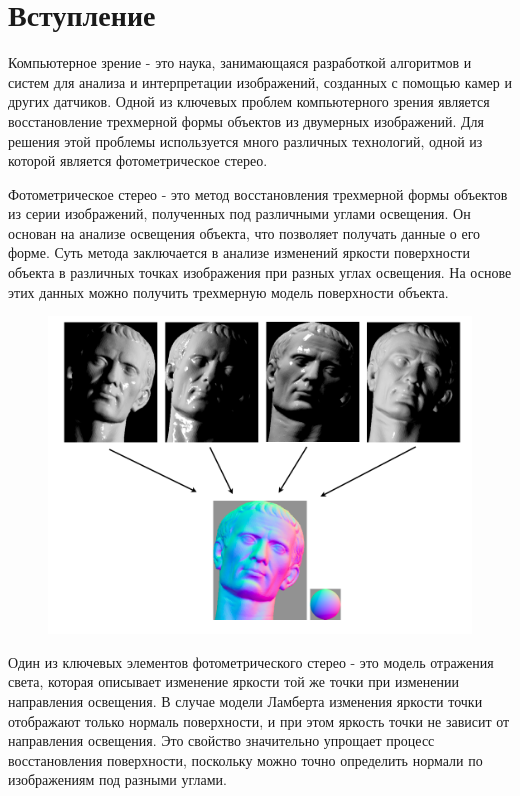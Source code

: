 \section{Вступление}

Компьютерное зрение - это наука, занимающаяся разработкой алгоритмов
и систем для анализа и интерпретации изображений, созданных с помощью
камер и других датчиков. Одной из ключевых проблем компьютерного
зрения является восстановление трехмерной формы объектов
из двумерных изображений. Для решения этой проблемы используется
много различных технологий, одной из которой является
фотометрическое стерео.

Фотометрическое стерео - это метод восстановления трехмерной формы
объектов из серии изображений, полученных под различными углами
освещения. Он основан на анализе освещения объекта,
что позволяет получать данные о его форме. Суть метода заключается
в анализе изменений яркости поверхности объекта в различных точках
изображения при разных углах освещения. На основе этих данных
можно получить трехмерную модель поверхности объекта.

\begin{figure}[h]
  \centering
  \includegraphics[scale=0.3]{tex/example.png}
\end{figure}

Один из ключевых элементов фотометрического стерео - это модель отражения
света, которая описывает изменение яркости той же точки при
изменении направления освещения. В случае модели Ламберта
изменения яркости точки отображают только нормаль поверхности,
и при этом яркость точки не зависит от направления освещения.
Это свойство значительно упрощает процесс восстановления поверхности,
поскольку можно точно определить нормали по изображениям под
разными углами.

